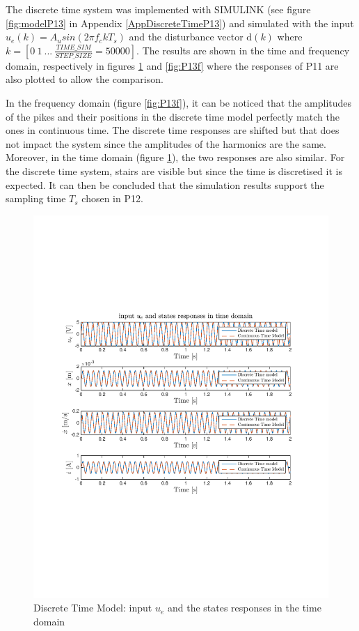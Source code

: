 The discrete time system was implemented with SIMULINK (see figure \ref{fig:modelP13} in Appendix \ref{AppDiscreteTimeP13}) and simulated with the input $u_e(k) = A_u sin(2\pi f_c k T_s)$ and the disturbance vector $\text{d}(k)$ where $k = [0 \ 1 \ ... \ \frac{TIME\_SIM}{STEP\_SIZE} = 50000]$. The results are shown in the time and frequency domain, respectively in figures \ref{fig:P13t} and \ref{fig:P13f} where the responses of P11 are also plotted to allow the comparison. 

In the frequency domain (figure \ref{fig:P13f}), it can be noticed that the amplitudes of the pikes and their positions in the discrete time model perfectly match the ones in continuous time. The discrete time responses are shifted but that does not impact the system since the amplitudes of the harmonics are the same. Moreover, in the time domain (figure \ref{fig:P13t}), the two responses are also similar. For the discrete time system, stairs are visible but since the time is discretised it is expected. It can then be concluded that the simulation results support the sampling time $T_s$ chosen in P12.

\begin{figure}[H]
 \centering 
 \includegraphics[trim=2cm 7cm 2cm 7cm, clip=true, totalheight=0.35\textheight, angle=0]{figures/P13timeDomain.pdf}
 \caption{Discrete Time Model: input $u_e$ and the states responses in the time domain}
 \label{fig:P13t}
\end{figure}

